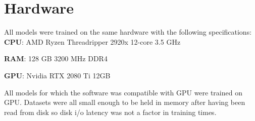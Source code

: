 \footnotesize
\renewcommand{\thechapter}{\Roman{chapter}}

\renewcommand{\thesection}{\Alph{section}.}

\chapter{Hardware}
\label{append:one}

All models were trained on the same hardware with the following specifications:
\textbf{CPU}: AMD Ryzen Threadripper 2920x 12-core 3.5 GHz

\textbf{RAM}: 128 GB 3200 MHz DDR4

\textbf{GPU}: Nvidia RTX 2080 Ti 12GB

All models for which the software was compatible with GPU were trained on GPU.
Datasets were all small enough to be held in memory after having been read from disk so disk i/o latency was not a factor in training times.